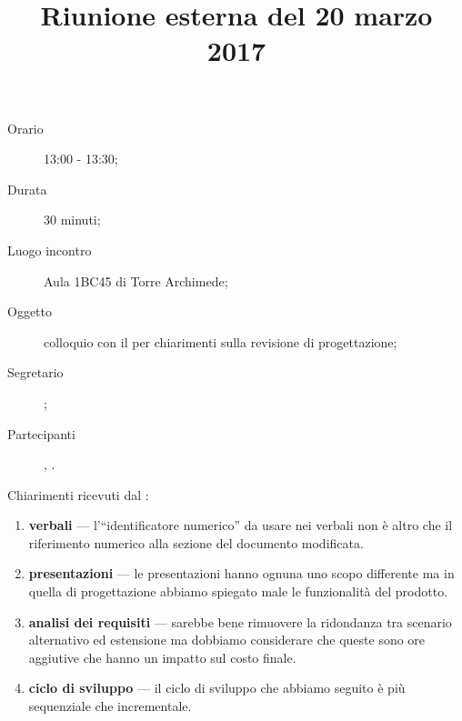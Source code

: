 


\author{\GG}
\supervisor{\MM}
\title{Riunione esterna del 20 marzo 2017}



\maketitle

\begin{description}
	\item[Orario] 13:00 - 13:30;
	\item[Durata] 30 minuti;
	\item[Luogo incontro] Aula 1BC45 di Torre Archimede;
	\item[Oggetto] colloquio con il \TV{} per chiarimenti sulla revisione di progettazione;
	\item[Segretario] \GG; 
	\item[Partecipanti] \TV, \ALL.
\end{description}

Chiarimenti ricevuti dal \TV:
\begin{enumerate}
	\item \textbf{verbali} --- l'“identificatore numerico” da usare nei verbali non è altro che il riferimento numerico alla sezione del documento modificata.
	\item \textbf{presentazioni} --- le presentazioni hanno ognuna uno scopo differente ma in quella di progettazione abbiamo spiegato male le funzionalità del prodotto.
	\item \textbf{analisi dei requisiti} --- sarebbe bene rimuovere la ridondanza tra scenario alternativo ed estensione ma dobbiamo considerare che queste sono ore aggiutive che hanno un impatto sul costo finale.
	\item \textbf{ciclo di sviluppo} --- il ciclo di sviluppo che abbiamo seguito è più sequenziale che incrementale.
\end{enumerate}


